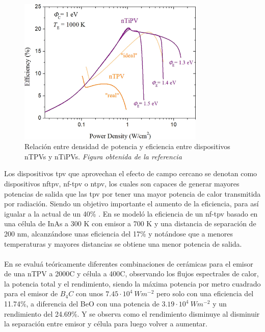 \begin{figure}[H]
	\centering
		\includegraphics[height=7cm]{figuras/PowerDensityVSEfficiency_nTiPV.png}
	\caption[Relación entre densidad de potencia y eficiencia entre dispositivos nTPVs y nTiPVs]{Relación entre densidad de potencia y eficiencia entre dispositivos nTPVs y nTiPVs. \textit{Figura obtenida de la referencia \cite{thermoionic_TPV_NF}}}
	\label{fig:PowerDensityVSEfficiency_nTiPV}
\end{figure}
Los dispositivos \acrshort{tpv} que aprovechan el efecto de campo cercano se denotan como dispositivos \acrshort{nftpv}, \acrshort{nf-tpv} o \acrshort{ntpv}, los cuales son capaces de generar mayores potencias de salida que las \acrshort{tpv} por tener una mayor potencia de calor transmitida por radiación. Siendo un objetivo importante el aumento de la eficiencia, para así igualar a la actual de un 40\% \cite{thermophotovoltaic_40}. En \cite{modelEfficiency_NF_TPV} se modeló la eficiencia de un \acrshort{nf-tpv} basado en una célula de InAs a 300 K con emisor a 700 K y una distancia de separación de 200 nm, alcanzándose unas eficiencia del 17\% y notándose que a menores temperaturas y mayores distancias se obtiene una menor potencia de salida.\\\\
En \cite{differentEmitterCeramics} se evaluá teóricamente diferentes combinaciones de cerámicas para el emisor de una nTPV a 2000\textdegree C y célula a 400\textdegree C, observando los flujos espectrales de calor, la potencia total y el rendimiento, siendo la máxima potencia por metro cuadrado para el emisor de $B_4C$ con unos $7.45\cdot 10^4 \ Wm^{-2}$ pero solo con una eficiencia del 11.74\%, a diferencia del BeO con una potencia de $3.19\cdot 10^4 \ Wm^{-2}$ y un rendimiento del 24.69\%. Y se observa como el rendimiento disminuye al disminuir la separación entre emisor y célula para luego volver a aumentar.\\\\
